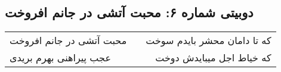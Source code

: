 \begin{center}
\section*{دوبیتی شماره ۶: محبت آتشی در جانم افروخت}
\label{sec:006}
\begin{longtable}{l p{0.5cm} r}
محبت آتشی در جانم افروخت
&&
که تا دامان محشر بایدم سوخت
\\
عجب پیراهنی بهرم بریدی
&&
که خیاط اجل میبایدش دوخت
\\
\end{longtable}
\end{center}
